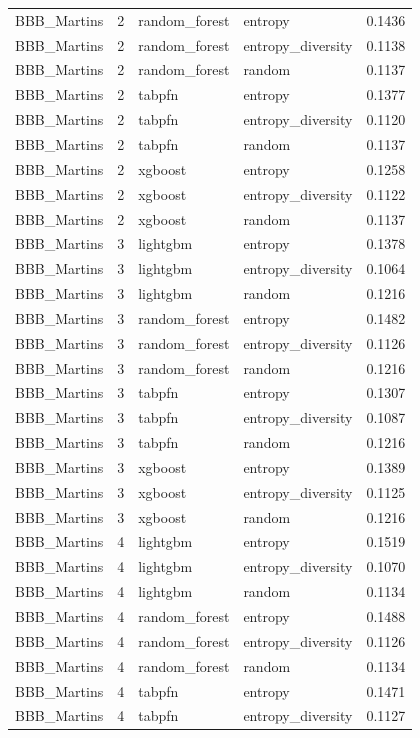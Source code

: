 \begin{tabular}{lrllr}
BBB_Martins & 2 & random_forest & entropy & 0.1436 \\
BBB_Martins & 2 & random_forest & entropy_diversity & 0.1138 \\
BBB_Martins & 2 & random_forest & random & 0.1137 \\
BBB_Martins & 2 & tabpfn & entropy & 0.1377 \\
BBB_Martins & 2 & tabpfn & entropy_diversity & 0.1120 \\
BBB_Martins & 2 & tabpfn & random & 0.1137 \\
BBB_Martins & 2 & xgboost & entropy & 0.1258 \\
BBB_Martins & 2 & xgboost & entropy_diversity & 0.1122 \\
BBB_Martins & 2 & xgboost & random & 0.1137 \\
BBB_Martins & 3 & lightgbm & entropy & 0.1378 \\
BBB_Martins & 3 & lightgbm & entropy_diversity & 0.1064 \\
BBB_Martins & 3 & lightgbm & random & 0.1216 \\
BBB_Martins & 3 & random_forest & entropy & 0.1482 \\
BBB_Martins & 3 & random_forest & entropy_diversity & 0.1126 \\
BBB_Martins & 3 & random_forest & random & 0.1216 \\
BBB_Martins & 3 & tabpfn & entropy & 0.1307 \\
BBB_Martins & 3 & tabpfn & entropy_diversity & 0.1087 \\
BBB_Martins & 3 & tabpfn & random & 0.1216 \\
BBB_Martins & 3 & xgboost & entropy & 0.1389 \\
BBB_Martins & 3 & xgboost & entropy_diversity & 0.1125 \\
BBB_Martins & 3 & xgboost & random & 0.1216 \\
BBB_Martins & 4 & lightgbm & entropy & 0.1519 \\
BBB_Martins & 4 & lightgbm & entropy_diversity & 0.1070 \\
BBB_Martins & 4 & lightgbm & random & 0.1134 \\
BBB_Martins & 4 & random_forest & entropy & 0.1488 \\
BBB_Martins & 4 & random_forest & entropy_diversity & 0.1126 \\
BBB_Martins & 4 & random_forest & random & 0.1134 \\
BBB_Martins & 4 & tabpfn & entropy & 0.1471 \\
BBB_Martins & 4 & tabpfn & entropy_diversity & 0.1127 \\

\end{tabular}
